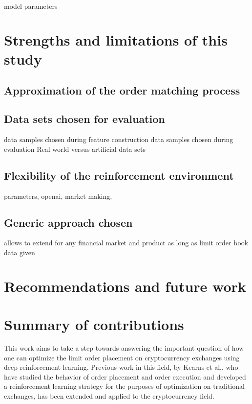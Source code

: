 model parameters


\section{Strengths and limitations of this study}

\subsection{Approximation of the order matching process}

\subsection{Data sets chosen for evaluation}
data samples chosen during feature construction
data samples chosen during evaluation
Real world versus artificial data sets

\subsection{Flexibility of the reinforcement environment}
parameters, openai, market making,

\subsection{Generic approach chosen}
allows to extend for any financial market and product as long as limit order book data given


\section{Recommendations and future work}

\section{Summary of contributions}

This work aims to take a step towards answering the important question of how one can optimize the limit order placement on cryptocurrency exchanges using deep reinforcement learning.
Previous work in this field, by Kearns et al., who have studied the behavior of order placement and order execution\cite{nevmyvaka2005electronic} and developed a reinforcement learning strategy\cite{nevmyvaka2006reinforcement} for the purposes of optimization on traditional exchanges, has been extended and applied to the cryptocurrency field.

